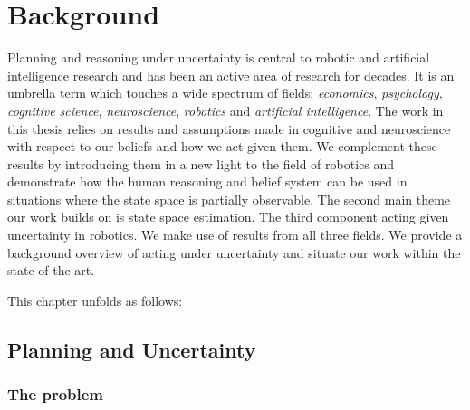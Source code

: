 \chapter{Background}

Planning and reasoning under uncertainty is central to robotic and artificial intelligence research and has 
been an active area of research for decades. It is an umbrella term which touches a
wide spectrum of fields: \textit{economics}, \textit{psychology}, \textit{cognitive science}, \textit{neuroscience},
\textit{robotics} and \textit{artificial intelligence}. The work in this thesis relies on results  and assumptions 
made in cognitive and neuroscience with respect to our beliefs and how we act given them. We complement 
these results by introducing them in a new light to the field of robotics and demonstrate how the human reasoning and belief system 
can be used in situations where the state space is partially observable. The second main theme our work builds on is 
state space estimation. The third component acting given uncertainty in robotics. We make use of results from all 
three fields. We provide a background overview of acting under uncertainty and situate our work within the state of the 
art.

This chapter unfolds as follows: 



\section{Planning and Uncertainty}

\subsection{The problem}

